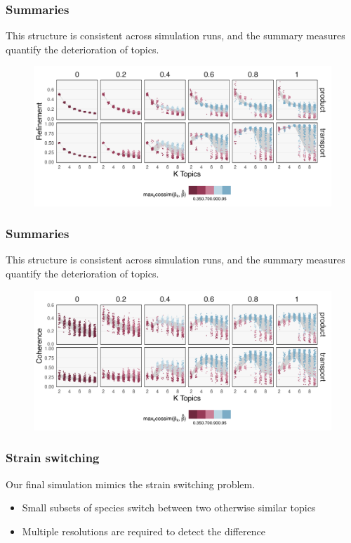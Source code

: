 \documentclass{beamer}
\begin{document}
\begin{frame}
  \frametitle{Summaries}
  This structure is consistent across simulation runs, and the summary measures
  quantify the deterioration of topics.
\begin{figure}
    \includegraphics[width=\textwidth]{gradient_refinement_full}
\end{figure}
\end{frame}

\begin{frame}
  \frametitle{Summaries}
  This structure is consistent across simulation runs, and the summary measures
  quantify the deterioration of topics.
\begin{figure}
    \includegraphics[width=\textwidth]{gradient_stability}
\end{figure}
\end{frame}

\begin{frame}
  \frametitle{Strain switching}
  Our final simulation mimics the strain switching problem.
  \begin{itemize}
    \item Small subsets of species switch between two otherwise similar topics
    \item Multiple resolutions are required to detect the difference
  \end{itemize}
\end{frame}
\end{document}
